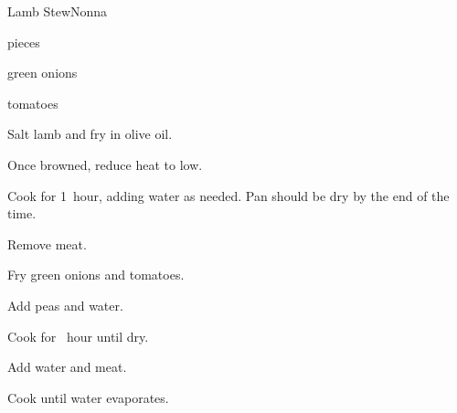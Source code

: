 \begin{recipe}{Lamb Stew}{Nonna}{}

\begin{ingredients}
\item {} pieces
\item green onions
\item tomatoes
\item {}
\end{ingredients}

\begin{directions}
\item Salt lamb and fry in olive oil.
\item Once browned, reduce heat to low.
\item Cook for 1\half~hour, adding water as needed. Pan should be dry by the end of the time.
\item Remove meat.
\item Fry green onions and tomatoes.
\item Add peas and water.
\item Cook for \half~hour until dry.
\item Add \C{\half} water and meat.
\item Cook until water evaporates.
\end{directions}

\end{recipe}
